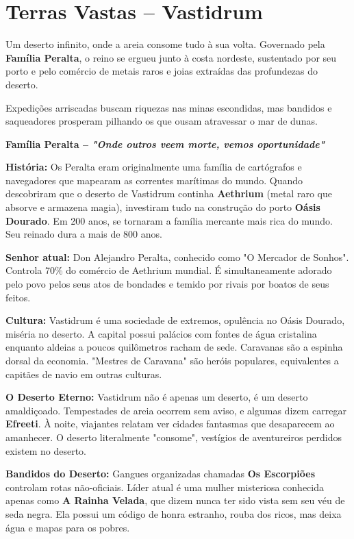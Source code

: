 \section*{Terras Vastas – Vastidrum}
Um deserto infinito, onde a areia consome tudo à sua volta. Governado pela \textbf{Família Peralta}, o reino se ergueu junto à costa nordeste, sustentado por seu porto e pelo comércio de metais raros e joias extraídas das profundezas do deserto.

Expedições arriscadas buscam riquezas nas minas escondidas, mas bandidos e saqueadores prosperam pilhando os que ousam atravessar o mar de dunas.

\textbf{\ringmfamily Família Peralta – \textit{"Onde outros veem morte, vemos oportunidade"}}

\textbf{\ringmfamily História:} Os Peralta eram originalmente uma família de cartógrafos e navegadores que mapearam as correntes marítimas do mundo. Quando descobriram que o deserto de Vastidrum continha \textbf{Aethrium} (metal raro que absorve e armazena magia), investiram tudo na construção do porto \textbf{Oásis Dourado}. Em 200 anos, se tornaram a família mercante mais rica do mundo. Seu reinado dura a mais de 800 anos.

\textbf{\ringmfamily Senhor atual:} Don Alejandro Peralta, conhecido como "O Mercador de Sonhos". Controla 70\% do comércio de Aethrium mundial. É simultaneamente adorado pelo povo pelos seus atos de bondades e temido por rivais por boatos de seus feitos.

\textbf{\ringmfamily Cultura:} Vastidrum é uma sociedade de extremos, opulência no Oásis Dourado, miséria no deserto. A capital possui palácios com fontes de água cristalina enquanto aldeias a poucos quilômetros racham de sede. Caravanas são a espinha dorsal da economia. "Mestres de Caravana" são heróis populares, equivalentes a capitães de navio em outras culturas.

\textbf{\ringmfamily O Deserto Eterno:} Vastidrum não é apenas um deserto, é um deserto amaldiçoado. Tempestades de areia ocorrem sem aviso, e algumas dizem carregar \textbf{Efreeti}. À noite, viajantes relatam ver cidades fantasmas que desaparecem ao amanhecer. O deserto literalmente "consome", vestígios de aventureiros perdidos existem no deserto.

\textbf{\ringmfamily Bandidos do Deserto:} Gangues organizadas chamadas \textbf{Os Escorpiões} controlam rotas não-oficiais. Líder atual é uma mulher misteriosa conhecida apenas como \textbf{A Rainha Velada}, que dizem nunca ter sido vista sem seu véu de seda negra. Ela possui um código de honra estranho, rouba dos ricos, mas deixa água e mapas para os pobres.

